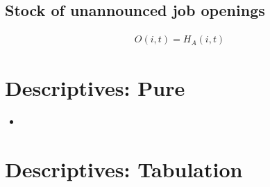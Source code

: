 \documentclass{article}
\begin{document}
\subsection*{Stock of unannounced job openings}
\begin{align}
O(i,t)=H_A(i,t)
\end{align}

\section{Descriptives: Pure}

\begin{itemize}
\item 
\end{itemize}


\section{Descriptives: Tabulation}
\end{document}
